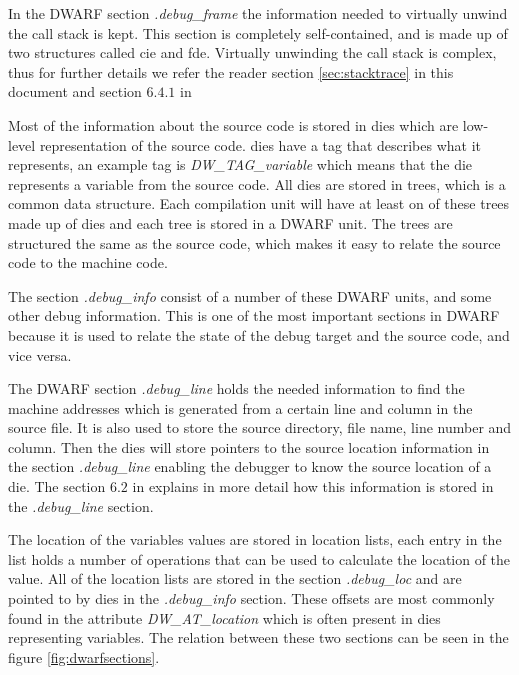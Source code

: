 In the \gls{DWARF} section \emph{.debug\_frame} the information needed to virtually unwind the call stack is kept.
This section is completely self-contained, and is made up of two structures called \acrfull{cie} and \acrfull{fde}.
Virtually unwinding the call stack is complex, thus for further details we refer the reader section \ref{sec:stacktrace} in this document and section $6.4.1$ in \cite{dwarf}


Most of the information about the source code is stored in \glspl{die} which are low-level representation of the source code.
\glspl{die} have a tag that describes what it represents, an example tag is \emph{DW\_TAG\_variable} which means that the \gls{die} represents a variable from the source code.
All \glspl{die} are stored in trees, which is a common data structure.
Each compilation unit will have at least on of these trees made up of \glspl{die} and each tree is stored in a \gls{DWARF} unit.
The trees are structured the same as the source code, which makes it easy to relate the source code to the machine code.

The section \emph{.debug\_info} consist of a number of these \gls{DWARF} units, and some other debug information.
This is one of the most important sections in \gls{DWARF} because it is used to relate the state of the debug target and the source code, and vice versa.


The \gls{DWARF} section \emph{.debug\_line} holds the needed information to find the machine addresses which is generated from a certain line and column in the source file.
It is also used to store the source directory, file name, line number and column.
Then the \glspl{die} will store pointers to the source location information in the section \emph{.debug\_line} enabling the debugger to know the source location of a \gls{die}.
The section $6.2$ in \cite{dwarf} explains in more detail how this information is stored in the \emph{.debug\_line} section.


The location of the variables values are stored in location lists, each entry in the list holds a number of operations that can be used to calculate the location of the value.
All of the location lists are stored in the section \emph{.debug\_loc} and are pointed to by \glspl{die} in the \emph{.debug\_info} section.
These offsets are most commonly found in the attribute \emph{DW\_AT\_location} which is often present in \glspl{die} representing variables.
The relation between these two sections can be seen in the figure \ref{fig:dwarfsections}.


